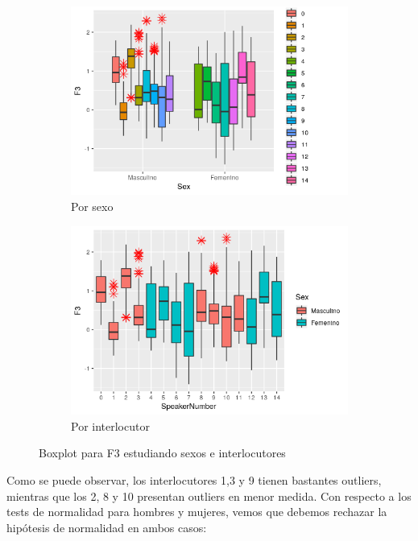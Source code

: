 \begin{figure}[H]
	\centering
	\begin{subfigure}{.5\textwidth}
		\centering
		\includegraphics[width=.9\linewidth]{bps3.png}
		\caption{Por sexo}
		\label{fig:bps3}
	\end{subfigure}%
	\begin{subfigure}{.5\textwidth}
		\centering
		\includegraphics[width=.9\linewidth]{bpsn3.png}
		\caption{Por interlocutor}
		\label{fig:bpsn3}
	\end{subfigure}
	\caption{Boxplot para F3 estudiando sexos e interlocutores}
	\label{fig:bf3}
\end{figure}

Como se puede observar, los interlocutores 1,3 y 9 tienen bastantes outliers, mientras que los 2, 8 y 10 presentan outliers en menor medida. Con respecto a los tests de normalidad para hombres y mujeres, vemos que debemos rechazar la hipótesis de normalidad en ambos casos:

